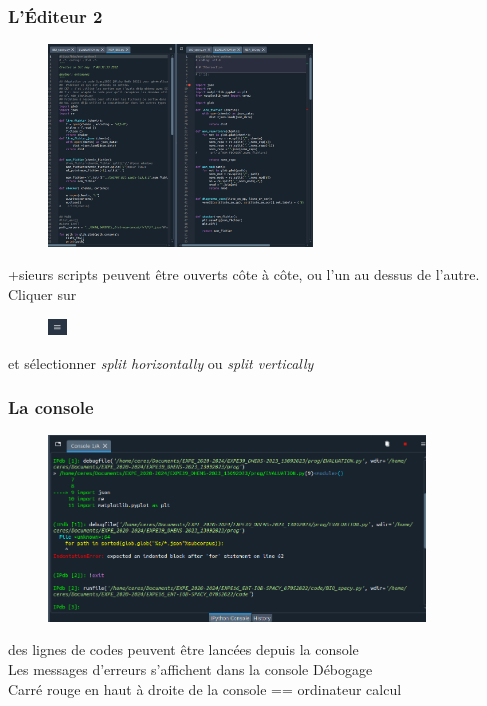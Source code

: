 \begin{frame} \frametitle{L'Éditeur 2}

  \begin{figure}
  \includegraphics[width=7cm]{images/spyder_editor2.png}
  \end{figure}
  
   +sieurs scripts peuvent être ouverts côte à côte, ou l'un au dessus de l'autre.\\
   Cliquer sur
  \vspace{-0.3cm} 
  \begin{figure}
  \includegraphics[width=0.5cm]{images/spyder_param.png}
  \end{figure} 
  \vspace{-0.3cm}
  et sélectionner \textit{split horizontally} ou \textit{split vertically}
\end{frame}

\begin{frame}  \frametitle{La console}
  \begin{figure}
  \includegraphics[width=10cm]{images/spyder_console.png}
  \end{figure}
   des lignes de codes peuvent être lancées depuis la console\\
   Les messages d'erreurs s'affichent dans la console  Débogage\\
   Carré rouge en haut à droite de la console  == ordinateur calcul
\end{frame}

